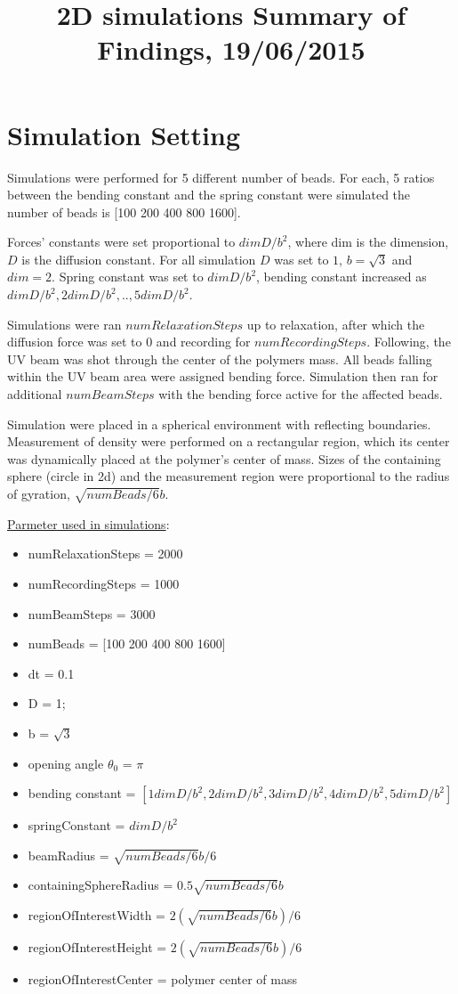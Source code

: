 \documentclass[12pt]{report}
\title{2D simulations Summary of Findings, 19/06/2015}
\begin{document}
	\maketitle
\section{Simulation Setting}
Simulations were performed for 5 different number of beads. For each, 5 ratios between the bending constant and the spring constant were simulated
the number of beads is [100 200 400 800 1600].

Forces' constants were set proportional to $dimD/b^2$, where dim is the dimension, $D$ is the diffusion constant. For all simulation $D$ was set to $1$, $b= \sqrt{3}$ and $dim =2$.
Spring constant was set to $dimD/b^2$, bending constant increased as $dimD/b^2, 2dimD/b^2,..,5dimD/b^2$.

Simulations were ran $numRelaxationSteps$ up to relaxation, after which the diffusion force was set to $0$ and recording for $numRecordingSteps$. Following, the UV beam was shot through the center of the polymers mass. All beads falling within the UV beam area were assigned bending force. Simulation then ran for additional $numBeamSteps$ with the bending force active for the affected beads.

Simulation were placed in a spherical environment with reflecting boundaries.
Measurement of density were performed on a rectangular region, which its center was dynamically placed at the polymer's center of mass.
Sizes of the containing sphere (circle in 2d) and the measurement region were proportional to the radius of gyration, $\sqrt{numBeads/6}b$.

\underline{Parmeter used in simulations}:

\begin{itemize}
\item numRelaxationSteps = 2000
\item numRecordingSteps  = 1000
\item numBeamSteps       = 3000
\item numBeads = [100 200 400 800 1600]
\item dt       = 0.1
\item D        = 1;
\item b        = $\sqrt{3}$
\item opening angle $\theta_0$ = $\pi$
\item bending constant = $[1dimD/b^2, 2dimD/b^2,3dimD/b^2,4dimD/b^2, 5dimD/b^2]$
\item springConstant   = $dimD/b^2$
\item beamRadius = $\sqrt{numBeads/6}b/6$
\item containingSphereRadius = $0.5\sqrt{numBeads/6}b$
\item regionOfInterestWidth  = $2(\sqrt{numBeads/6}b)/6$
\item regionOfInterestHeight = $2(\sqrt{numBeads/6}b)/6$
\item regionOfInterestCenter = polymer center of mass
\end{itemize}
\end{document}
